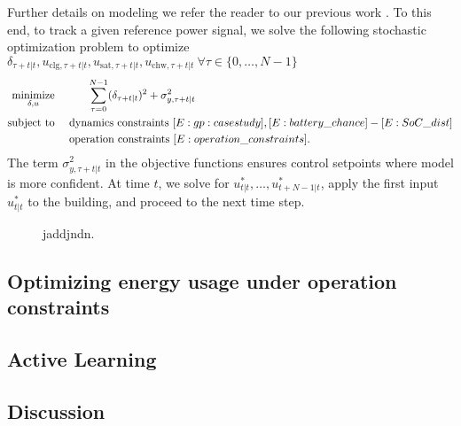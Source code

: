 Further details on modeling we refer the reader to our previous work \cite{nghiemetal16gp}.
To this end, to track a given reference power signal, we solve the following stochastic optimization problem to optimize \(\delta_{\tau+t|t},u_{\mathrm{clg},\tau+t|t},u_{\mathrm{sat},\tau+t|t},u_{\mathrm{chw},\tau+t|t} \ \forall \tau \in \{0,\dots,N-1\}\)
\begin{align}
\label{E:casestudy:mpc}
\minimize_{\delta, u} & \ \ \ \ \ \ \ \ \ \sum_{\tau=0}^{N-1} (\delta_{\tau+t|t})^2 + \sigma_{y,\tau+t|t}^2\\
\st &  \ \ \ \  \text{dynamics constraints } \eqref{E:gp:casestudy}, \eqref{E:battery_chance} - \eqref{E:SoC_dist} \nonumber \\
&  \ \ \ \  \text{operation constraints } \eqref{E:operation_constraints}. \nonumber
\end{align}
The term \( \sigma_{y,\tau+t|t}^2\) in the objective functions ensures control setpoints where model is more confident.
At time \(t\), we solve for \(u^*_{t|t},\dots,u^*_{t+N-1|t} \), apply the first input \(u^*_{t|t} \) to the building, and proceed to the next time step.

\begin{figure}[!tb]
	\centering
	\setlength{}
	\setlength{}	
	
	\setlength{}
	\setlength{}	
	
	\setlength{}
	\setlength{}	
		
	\caption{jaddjndn.}
	\captionsetup{justification=centering}
	\label{F:control:tracking}
\end{figure}


\subsection{Optimizing energy usage under operation constraints}
\label{SS:energy_management}



\subsection{Active Learning}
\label{SS:casestudy:active}

\subsection{Discussion}



